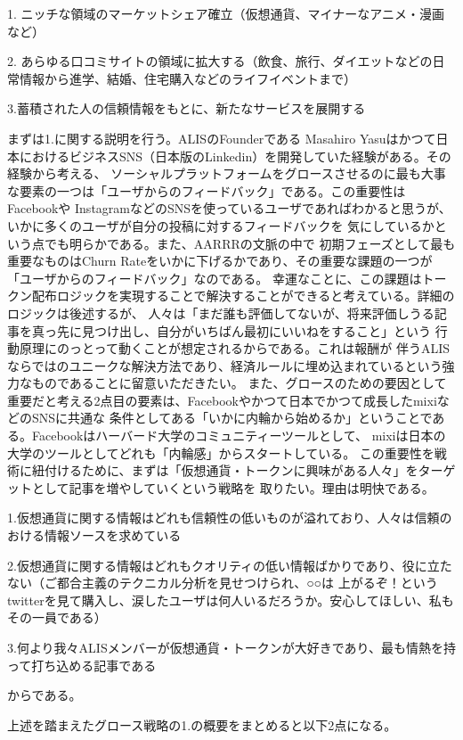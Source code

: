\documentclass{jsarticle}
\begin{document}
1. ニッチな領域のマーケットシェア確立（仮想通貨、マイナーなアニメ・漫画など）

2. あらゆる口コミサイトの領域に拡大する（飲食、旅行、ダイエットなどの日常情報から進学、結婚、住宅購入などのライフイベントまで）

3.蓄積された人の信頼情報をもとに、新たなサービスを展開する

まずは1.に関する説明を行う。ALISのFounderである
Masahiro Yasuはかつて日本におけるビジネスSNS（日本版のLinkedin）を開発していた経験がある。その経験から考える、
ソーシャルプラットフォームをグロースさせるのに最も大事な要素の一つは「ユーザからのフィードバック」である。この重要性はFacebookや
InstagramなどのSNSを使っているユーザであればわかると思うが、いかに多くのユーザが自分の投稿に対するフィードバックを
気にしているかという点でも明らかである。また、AARRRの文脈の中で
初期フェーズとして最も重要なものはChurn Rateをいかに下げるかであり、その重要な課題の一つが「ユーザからのフィードバック」なのである。
幸運なことに、この課題はトークン配布ロジックを実現することで解決することができると考えている。詳細のロジックは後述するが、
人々は「まだ誰も評価してないが、将来評価しうる記事を真っ先に見つけ出し、自分がいちばん最初にいいねをすること」という
行動原理にのっとって動くことが想定されるからである。これは報酬が
伴うALISならではのユニークな解決方法であり、経済ルールに埋め込まれているという強力なものであることに留意いただきたい。
また、グロースのための要因として重要だと考える2点目の要素は、Facebookやかつて日本でかつて成長したmixiなどのSNSに共通な
条件としてある「いかに内輪から始めるか」ということである。Facebookはハーバード大学のコミュニティーツールとして、
mixiは日本の大学のツールとしてどれも「内輪感」からスタートしている。
この重要性を戦術に紐付けるために、まずは「仮想通貨・トークンに興味がある人々」をターゲットとして記事を増やしていくという戦略を
取りたい。理由は明快である。

1.仮想通貨に関する情報はどれも信頼性の低いものが溢れており、人々は信頼のおける情報ソースを求めている

2.仮想通貨に関する情報はどれもクオリティの低い情報ばかりであり、役に立たない（ご都合主義のテクニカル分析を見せつけられ、○○は
上がるぞ！というtwitterを見て購入し、涙したユーザは何人いるだろうか。安心してほしい、私もその一員である）

3.何より我々ALISメンバーが仮想通貨・トークンが大好きであり、最も情熱を持って打ち込める記事である

からである。

上述を踏まえたグロース戦略の1.の概要をまとめると以下2点になる。
\end{document}
